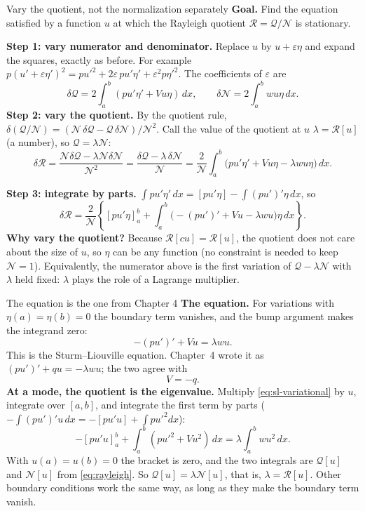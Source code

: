 \documentclass[11pt]{beamer}
\newcommand{\dd}{\,d}
\newcommand{\Q}{\mathcal Q}
\newcommand{\N}{\mathcal N}
\newcommand{\R}{\mathcal R}
\begin{document}
\begin{frame}[allowframebreaks=1.00]{Vary the quotient, not the normalization separately}
\small
\textbf{Goal.} Find the equation satisfied by a function \(u\) at which the Rayleigh quotient
\(\R=\Q/\N\) is stationary.

\textbf{Step 1: vary numerator and denominator.} Replace \(u\) by \(u+\varepsilon\eta\) and expand the squares, exactly as
before. For example \(p(u'+\varepsilon\eta')^2=pu'^2+2\varepsilon\,pu'\eta'+\varepsilon^2p\eta'^2\). The coefficients of \(\varepsilon\) are
\[
 \delta\Q=2\int_a^b(pu'\eta'+Vu\eta)\dd x,
 \qquad \delta\N=2\int_a^bwu\eta\dd x.
\]
\textbf{Step 2: vary the quotient.} By the quotient rule, \(\delta(\Q/\N)=(\N\,\delta\Q-\Q\,\delta\N)/\N^2\). Call the
value of the quotient at \(u\) \(\lambda=\R[u]\) (a number), so \(\Q=\lambda\N\):
\[
 \delta\R=\frac{\N\delta\Q-\lambda\N\delta\N}{\N^2}=\frac{\delta\Q-\lambda\,\delta\N}{\N}
 =\frac{2}{\N}\int_a^b\bigl(pu'\eta'+Vu\eta-\lambda wu\eta\bigr)\dd x .
\]
\par\framebreak\par
\textbf{Step 3: integrate by parts.} \(\int pu'\eta'\,dx=[pu'\eta]-\int(pu')'\eta\,dx\), so
\[
 \delta\R=\frac{2}{\N}\left\{[pu'\eta]_a^b+
     \int_a^b\bigl(-(pu')'+Vu-\lambda wu\bigr)\eta\dd x\right\}.
\]
\textbf{Why vary the quotient?} Because \(\R[cu]=\R[u]\), the quotient does not care about the size of \(u\),
so \(\eta\) can be any function (no constraint is needed to keep \(\N=1\)). Equivalently, the numerator above
is the first variation of \(\Q-\lambda\N\) with \(\lambda\) held fixed: \(\lambda\) plays the role of a Lagrange
multiplier.
\end{frame}

\begin{frame}[allowframebreaks=1.00]{The equation is the one from Chapter 4}
\small
\textbf{The equation.} For variations with \(\eta(a)=\eta(b)=0\) the boundary term vanishes, and the bump argument
makes the integrand zero:
\begin{equation}
 -(pu')'+Vu=\lambda wu.\label{eq:sl-variational}
\end{equation}
This is the Sturm--Liouville equation. Chapter~4 wrote it as \((pu')'+qu=-\lambda wu\); the two agree with
\[
 V=-q .
\]
\textbf{At a mode, the quotient is the eigenvalue.} Multiply \eqref{eq:sl-variational} by \(u\), integrate over \([a,b]\),
and integrate the first term by parts (\(-\int(pu')'u\,dx=-[pu'u]+\int pu'^2dx\)):
\[
 -[pu'u]_a^b+\int_a^b(pu'^2+Vu^2)\dd x
 =\lambda\int_a^bwu^2\dd x.
\]
With \(u(a)=u(b)=0\) the bracket is zero, and the two integrals are \(\Q[u]\) and \(\N[u]\) from
\eqref{eq:rayleigh}. So \(\Q[u]=\lambda\N[u]\), that is, \(\lambda=\R[u]\). Other boundary conditions work the same
way, as long as they make the boundary term vanish.
\end{frame}
\end{document}
